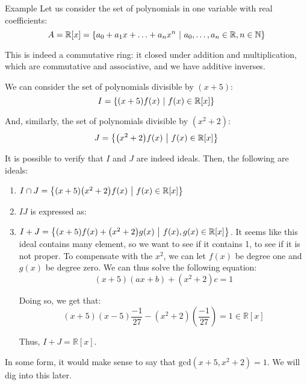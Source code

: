 \documentclass[a4paper]{article}
\begin{document}
\begin{parag}{Example}
    Let us consider the set of polynomials in one variable with real coefficients: 
    \[A = \mathbb{R}\left[x\right] = \left\{a_0 + a_1 x + \ldots + a_n x^n \suchthat a_0, \ldots, a_n \in \mathbb{R}, n \in \mathbb{N}\right\}\]
   
    This is indeed a commutative ring: it closed under addition and multiplication, which are commutative and associative, and we have additive inverses.

    We can consider the set of polynomials divisible by $\left(x+5\right)$: 
    \[I = \left\{\left(x+5\right)f\left(x\right) \suchthat f\left(x\right) \in \mathbb{R}\left[x\right]\right\}\]

    And, similarly, the set of polynomials divisible by $\left(x^2 + 2\right)$: 
    \[J = \left\{\left(x^2 + 2\right) f\left(x\right) \suchthat f\left(x\right) \in \mathbb{R}\left[x\right]\right\}\]
    
    It is possible to verify that $I$ and $J$ are indeed ideals. Then, the following are ideals:
    \begin{enumerate}
        \item $I \cap J = \left\{\left(x + 5\right)\left(x^2 + 2\right)f\left(x\right) \suchthat f\left(x\right) \in \mathbb{R}\left[x\right]\right\}$
        \item $IJ$ is expressed as:

        \item $I + J = \left\{\left(x + 5\right)f\left(x\right) + \left(x^2 + 2\right)g\left(x\right) \suchthat f\left(x\right), g\left(x\right) \in \mathbb{R}\left[x\right]\right\}$. It seems like this ideal contains many element, so we want to see if it contains 1, to see if it is not proper. To compensate with the $x^2$, we can let $f\left(x\right)$ be degree one and $g\left(x\right)$ be degree zero. We can thus solve the following equation: 
        \[\left(x+5\right)\left(ax + b\right) + \left(x^2 + 2\right)c = 1\]
        
        Doing so, we get that: 
        \[\left(x + 5\right)\left(x-5\right)\frac{-1}{27} - \left(x^2 + 2\right)\left(\frac{-1}{27}\right) =  1 \in \mathbb{R}\left[x\right]\]
        
        Thus, $I + J = \mathbb{R}\left[x\right]$.
    \end{enumerate}

    In some form, it would make sense to say that $\text{gcd}\left(x+5, x^2 + 2\right) = 1$. We will dig into this later.
\end{parag}
\end{document}
